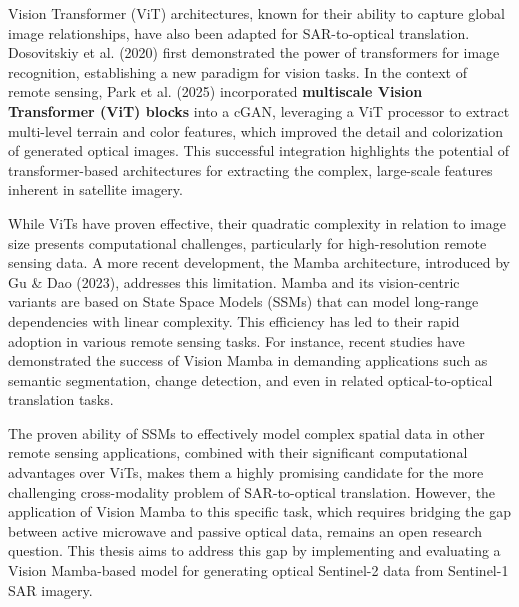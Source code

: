 Vision Transformer (ViT) architectures, known for their ability to capture global image relationships, have also been adapted for SAR-to-optical translation. Dosovitskiy et al. (2020) first demonstrated the power of transformers for image recognition, establishing a new paradigm for vision tasks. In the context of remote sensing, Park et al. (2025) incorporated \textbf{multiscale Vision Transformer (ViT) blocks} into a cGAN, leveraging a ViT processor to extract multi-level terrain and color features, which improved the detail and colorization of generated optical images. This successful integration highlights the potential of transformer-based architectures for extracting the complex, large-scale features inherent in satellite imagery.

While ViTs have proven effective, their quadratic complexity in relation to image size presents computational challenges, particularly for high-resolution remote sensing data. A more recent development, the Mamba architecture, introduced by Gu \& Dao (2023), addresses this limitation. Mamba and its vision-centric variants are based on State Space Models (SSMs) that can model long-range dependencies with linear complexity. This efficiency has led to their rapid adoption in various remote sensing tasks. For instance, recent studies have demonstrated the success of Vision Mamba in demanding applications such as semantic segmentation, change detection, and even in related optical-to-optical translation tasks.

The proven ability of SSMs to effectively model complex spatial data in other remote sensing applications, combined with their significant computational advantages over ViTs, makes them a highly promising candidate for the more challenging cross-modality problem of SAR-to-optical translation. However, the application of Vision Mamba to this specific task, which requires bridging the gap between active microwave and passive optical data, remains an open research question. This thesis aims to address this gap by implementing and evaluating a Vision Mamba-based model for generating optical Sentinel-2 data from Sentinel-1 SAR imagery.



